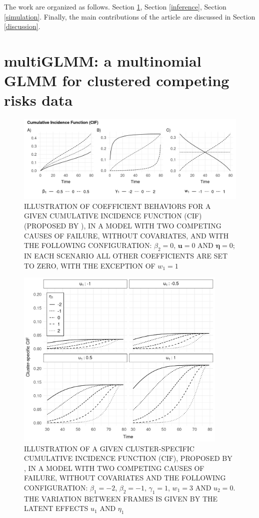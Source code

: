 \documentclass[a4paper,12pt]{article}
\begin{document}
The work are organized as follows. Section \ref{model}, Section
\ref{inference}, Section \ref{simulation}. Finally, the main
contributions of the article are discussed in Section \ref{discussion}.

\section{multiGLMM: a multinomial GLMM for clustered competing risks data}
\label{model}

\begin{figure}[H]
 \centering \includegraphics[width=\textwidth]{pics/cifcoefs-1.png}
 \caption{ILLUSTRATION OF COEFFICIENT BEHAVIORS FOR A GIVEN CUMULATIVE
          INCIDENCE FUNCTION (CIF) (PROPOSED BY ),
          IN A MODEL WITH TWO COMPETING CAUSES OF FAILURE, WITHOUT
          COVARIATES, AND WITH THE FOLLOWING CONFIGURATION: \(\beta_{2}
          = 0\), \(\bm{u} = 0\) AND \(\bm{\eta} = 0\); IN EACH SCENARIO
          ALL OTHER COEFFICIENTS ARE SET TO ZERO, WITH THE EXCEPTION
          OF \(w_{1} = 1\)}
 \label{fig:cifcoefs}
\end{figure}

\begin{figure}[H]
 \centering
 \includegraphics[width=0.9\textwidth]{pics/cif-1.png}
 \caption{ILLUSTRATION OF A GIVEN CLUSTER-SPECIFIC CUMULATIVE INCIDENCE
          FUNCTION (CIF), PROPOSED BY , IN A MODEL
          WITH TWO COMPETING CAUSES OF FAILURE, WITHOUT COVARIATES AND
          THE FOLLOWING CONFIGURATION: \(\beta_{1} = -2\),
          \(\beta_{2} = -1\), \(\gamma_{1} = 1\), \(w_{1} = 3\) AND
          \(u_{2} = 0\). THE VARIATION BETWEEN FRAMES IS GIVEN BY THE
          LATENT EFFECTS \(u_{1}\) AND \(\eta_{1}\)}
 \label{fig:cif}
\end{figure}
\end{document}

